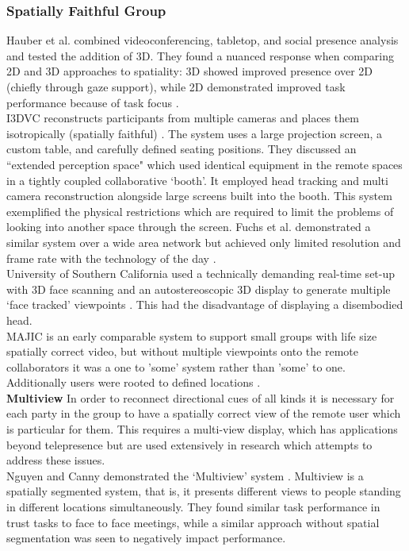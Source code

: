             \subsubsection{Spatially Faithful Group}
                Hauber et al. combined videoconferencing, tabletop, and social presence analysis and tested the addition of 3D. They found a nuanced response when comparing 2D and 3D approaches to spatiality: 3D showed improved presence over 2D (chiefly through gaze support), while 2D demonstrated improved task performance because of task focus \cite{Hauber2006}.\\
                I3DVC reconstructs participants from multiple cameras and places them isotropically (spatially faithful) \cite{Kauff2002, Kauff2002a}. The system uses a large projection screen, a custom table, and carefully defined seating positions. They discussed an ``extended perception space" which used identical equipment in the remote spaces in a tightly coupled collaborative `booth'. It employed head tracking and multi camera reconstruction alongside large screens built into the booth. This system exemplified the physical restrictions which are required to limit the problems of looking into another space through the screen. Fuchs et al. demonstrated a similar system over a wide area network but achieved only limited resolution and frame rate with the technology of the day \cite{Fuchs:2002ww}. \\ University of Southern California used a technically demanding real-time set-up with 3D face scanning and an autostereoscopic 3D display to generate multiple `face tracked' viewpoints \cite{jones2009headspin}. This had the disadvantage of displaying a disembodied head.\\                
MAJIC is an early comparable system to support small groups with life size spatially correct video, but without multiple viewpoints onto the remote collaborators it was a one to 'some' system rather than 'some' to one. Additionally users were rooted to defined locations \cite{Ichikawa1995, Okada:1994et}.\\


\textbf{Multiview}
In order to reconnect directional cues of all kinds it is necessary for each party in the group to have a spatially correct view of the remote user which is particular for them. This requires a multi-view display, which has applications beyond telepresence but are used extensively in research which attempts to address these issues.\\
Nguyen and Canny demonstrated the `Multiview' system \cite{Nguyen2005}. Multiview is a spatially segmented system, that is, it presents different views to people standing in different locations simultaneously. They found similar task performance in trust tasks to face to face meetings, while a similar approach without spatial segmentation was seen to negatively impact performance.\\
                    
